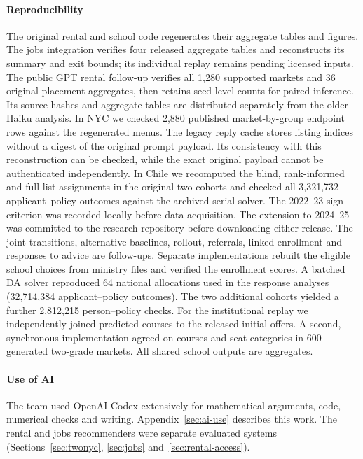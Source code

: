 \paragraph{Reproducibility}
The original rental and school code regenerates their aggregate tables and figures. The jobs integration verifies four released aggregate tables and reconstructs its summary and exit bounds; its individual replay remains pending licensed inputs. The public GPT rental follow-up verifies all 1,280 supported markets and 36 original placement aggregates, then retains seed-level counts for paired inference. Its source hashes and aggregate tables are distributed separately from the older Haiku analysis. In NYC we checked 2,880 published market-by-group endpoint rows against the regenerated menus. The legacy reply cache stores listing indices without a digest of the original prompt payload. Its consistency with this reconstruction can be checked, while the exact original payload cannot be authenticated independently. In Chile we recomputed the blind, rank-informed and full-list assignments in the original two cohorts and checked all 3,321,732 applicant--policy outcomes against the archived serial solver. The 2022--23 sign criterion was recorded locally before data acquisition. The extension to 2024--25 was committed to the research repository before downloading either release. The joint transitions, alternative baselines, rollout, referrals, linked enrollment and responses to advice are follow-ups. Separate implementations rebuilt the eligible school choices from ministry files and verified the enrollment scores. A batched DA solver reproduced 64 national allocations used in the response analyses (32,714,384 applicant--policy outcomes). The two additional cohorts yielded a further 2,812,215 person--policy checks. For the institutional replay we independently joined predicted courses to the released initial offers. A second, synchronous implementation agreed on courses and seat categories in 600 generated two-grade markets. All shared school outputs are aggregates.

\paragraph{Use of AI}
The team used OpenAI Codex extensively for mathematical arguments, code, numerical checks and writing. Appendix~\ref{sec:ai-use} describes this work. The rental and jobs recommenders were separate evaluated systems (Sections~\ref{sec:twonyc}, \ref{sec:jobs} and~\ref{sec:rental-access}).
